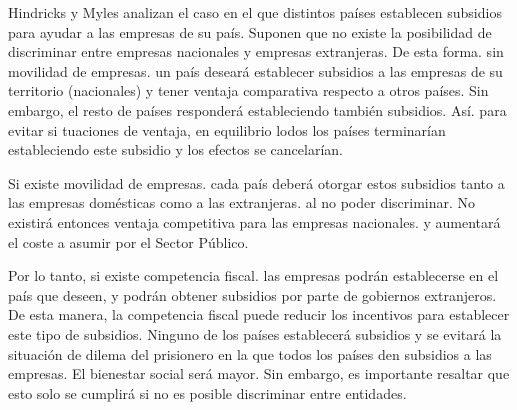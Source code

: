 \documentclass[10pt,a4paper]{article}
\begin{document}
Hindricks y Myles analizan el caso en el que distintos países establecen subsidios para ayudar a las empresas de su país. Suponen que no existe la posibilidad de discriminar entre empresas nacionales y empresas extranjeras. De esta forma. sin movilidad de empresas. un país deseará establecer subsidios a las empresas de su territorio (nacionales) y tener ventaja comparativa respecto a otros países. Sin embargo, el resto de países responderá estableciendo también subsidios. Así. para evitar si tuaciones de ventaja, en equilibrio lodos los países terminarían estableciendo este subsidio y los efectos se cancelarían.

Si existe movilidad de empresas. cada país deberá otorgar estos subsidios tanto a las empresas domésticas como a las extranjeras. al no poder discriminar. No existirá entonces ventaja competitiva para las empresas nacionales. y aumentará el coste a asumir por el Sector Público.

Por lo tanto, si existe competencia fiscal. las empresas podrán establecerse en el país que deseen, y podrán obtener subsidios por parte de gobiernos extranjeros. De esta manera, la competencia fiscal puede reducir los incentivos para establecer este tipo de subsidios. Ninguno de los países establecerá subsidios y se evitará la situación de dilema del prisionero en la que todos los países den subsidios a las empresas. El bienestar social será mayor. Sin embargo, es importante resaltar que esto solo se cumplirá si no es posible discriminar entre entidades.
\end{document}
